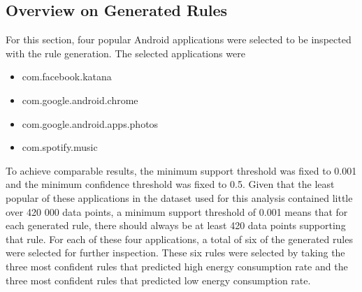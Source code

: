 
\subsection{Overview on Generated Rules}

For this section, four popular Android applications were selected to be inspected with the rule generation. The selected applications were 

\begin{itemize}
	\item com.facebook.katana
	\item com.google.android.chrome
	\item com.google.android.apps.photos
	\item com.spotify.music
\end{itemize}

To achieve comparable results, the minimum support threshold was fixed to 0.001 and the minimum confidence threshold was fixed to 0.5. Given that the least popular of these applications in the dataset used for this analysis contained little over 420 000 data points, a minimum support threshold of 0.001 means that for each generated rule, there should always be at least 420 data points supporting that rule. For each of these four applications, a total of six of the generated rules were selected for further inspection. These six rules were selected by taking the three most confident rules that predicted high energy consumption rate and the three most confident rules that predicted low energy consumption rate.  

